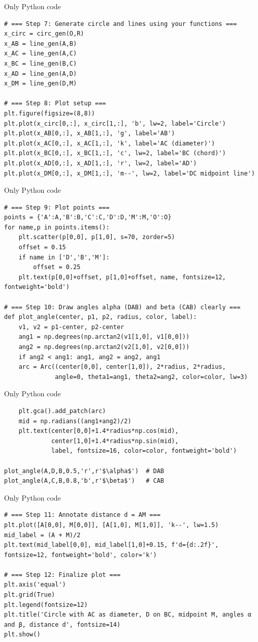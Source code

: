 \documentclass{beamer}
\begin{document}
\begin{frame}[fragile]{Only Python code}
\begin{lstlisting}
# === Step 7: Generate circle and lines using your functions ===
x_circ = circ_gen(O,R)
x_AB = line_gen(A,B)
x_AC = line_gen(A,C)
x_BC = line_gen(B,C)
x_AD = line_gen(A,D)
x_DM = line_gen(D,M)

# === Step 8: Plot setup ===
plt.figure(figsize=(8,8))
plt.plot(x_circ[0,:], x_circ[1,:], 'b', lw=2, label='Circle')
plt.plot(x_AB[0,:], x_AB[1,:], 'g', label='AB')
plt.plot(x_AC[0,:], x_AC[1,:], 'k', label='AC (diameter)')
plt.plot(x_BC[0,:], x_BC[1,:], 'c', lw=2, label='BC (chord)')
plt.plot(x_AD[0,:], x_AD[1,:], 'r', lw=2, label='AD')
plt.plot(x_DM[0,:], x_DM[1,:], 'm--', lw=2, label='DC midpoint line')
 \end{lstlisting}
\end{frame}
\begin{frame}[fragile]{Only Python code}
\begin{lstlisting}
# === Step 9: Plot points ===
points = {'A':A,'B':B,'C':C,'D':D,'M':M,'O':O}
for name,p in points.items():
    plt.scatter(p[0,0], p[1,0], s=70, zorder=5)
    offset = 0.15
    if name in ['D','B','M']:
        offset = 0.25
    plt.text(p[0,0]+offset, p[1,0]+offset, name, fontsize=12, fontweight='bold')

# === Step 10: Draw angles alpha (DAB) and beta (CAB) clearly ===
def plot_angle(center, p1, p2, radius, color, label):
    v1, v2 = p1-center, p2-center
    ang1 = np.degrees(np.arctan2(v1[1,0], v1[0,0]))
    ang2 = np.degrees(np.arctan2(v2[1,0], v2[0,0]))
    if ang2 < ang1: ang1, ang2 = ang2, ang1
    arc = Arc((center[0,0], center[1,0]), 2*radius, 2*radius,
              angle=0, theta1=ang1, theta2=ang2, color=color, lw=3)
               \end{lstlisting}
\end{frame}
\begin{frame}[fragile]{Only Python code}
\begin{lstlisting}
    plt.gca().add_patch(arc)
    mid = np.radians((ang1+ang2)/2)
    plt.text(center[0,0]+1.4*radius*np.cos(mid),
             center[1,0]+1.4*radius*np.sin(mid),
             label, fontsize=16, color=color, fontweight='bold')

plot_angle(A,D,B,0.5,'r',r'$\alpha$')  # DAB
plot_angle(A,C,B,0.8,'b',r'$\beta$')   # CAB
 \end{lstlisting}
\end{frame}
\begin{frame}[fragile]{Only Python code}
\begin{lstlisting}
# === Step 11: Annotate distance d = AM ===
plt.plot([A[0,0], M[0,0]], [A[1,0], M[1,0]], 'k--', lw=1.5)
mid_label = (A + M)/2
plt.text(mid_label[0,0], mid_label[1,0]+0.15, f'd={d:.2f}', fontsize=12, fontweight='bold', color='k')

# === Step 12: Finalize plot ===
plt.axis('equal')
plt.grid(True)
plt.legend(fontsize=12)
plt.title('Circle with AC as diameter, D on BC, midpoint M, angles α and β, distance d', fontsize=14)
plt.show()

 \end{lstlisting}
\end{frame}
\end{document}
